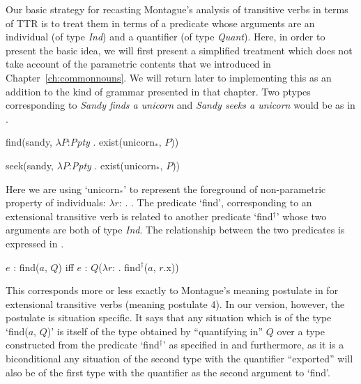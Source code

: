 Our basic strategy for recasting Montague's analysis of transitive
verbs in terms of TTR is to treat them in terms of a predicate whose
arguments are an individual (of type \textit{Ind}) and a quantifier
(of type \textit{Quant}).  Here, in order to present the basic idea, we will first present a simplified
treatment which does not take account of the parametric contents that
we introduced in Chapter~\ref{ch:commonnouns}.  We will return later
to implementing this as an addition to the kind of grammar presented
in that chapter.  Two ptypes corresponding to
\textit{Sandy finds a unicorn} and \textit{Sandy seeks a unicorn}
would be as in \nexteg{}.
\begin{ex} 
\begin{subex} 
 
\item find(sandy, $\lambda P$:\textit{Ppty} . exist(unicorn$_*$, $P$)) 
 
\item seek(sandy, $\lambda P$:\textit{Ppty} . exist(unicorn$_*$, $P$)) 
 
\end{subex} 

\end{ex} 
Here we are using `unicorn$_*$' to represent the foreground of  non-parametric
property of individuals: $\lambda
r$:
. .  The predicate
`find', corresponding to an extensional transitive verb is related to
another predicate `find$^{\dagger}$' whose two arguments are both of
type \textit{Ind}.  The relationship between the two predicates is
expressed in \nexteg{}.
\begin{ex} 
$e$ : find($a$, $Q$) iff $e$ : $Q$($\lambda
r$: . find$^{\dagger}$($a$,
$r$.x))
\label{ex:mp-find} 
\end{ex} 
This corresponds more or less exactly to Montague's meaning postulate
in \cite{Montague1973} for extensional transitive verbs (meaning
postulate 4).  In our version, however, the postulate is situation
specific.  It says that any situation which is of the type `find($a$,
$Q$)' is itself of the type obtained by ``quantifying in'' $Q$ over a
type constructed from the predicate `find$^{\dagger}$' as specified
in \preveg{} and furthermore, as it is a biconditional any situation
of the second type with the quantifier ``exported'' will also be of
the first type with the quantifier as the second argument to `find'. 

